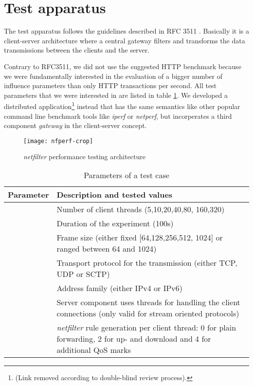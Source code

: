 \documentclass{sig-alternate}
\begin{document}
\section{Test apparatus}
\label{sec::apparatus}
\noindent The test apparatus follows the guidelines described in RFC 3511 
\cite{/RFC3511/}. Basically it is a client-server architecture where a 
central gateway filters and transforms the data transmissions between the 
clients and the server.

Contrary to RFC3511, we did not use the suggested HTTP benchmark because we 
were fundamentally interested in the evaluation of a bigger number of influence 
parameters than only HTTP transactions per se\-cond. All test parameters that 
we were interested in are listed in table \ref{tab::parameters}. We developed a 
distributed application\footnote{(Link removed according to double-blind 
review process).} instead that has the same semantics like other popular command 
line benchmark tools like \emph{iperf} or \emph{netperf}, but incorperates a 
third component \emph{gateway} in the client-server concept.
\begin{figure}[!t]
\texttt{[image: nfperf-crop]}
\caption{\emph{netfilter} performance testing architecture}
\label{fig::architecture}
\end{figure}
\begin{table}[htb]
\caption{Parameters of a test case}\label{tab::parameters}
\footnotesize
\begin{tabular}{|c|p{}|}
\hline \textbf{Parameter} & \textbf{Description and tested values} \\
\hline  & Number of client threads (5,10,20,40,80, 160,320) \\
\hline  & Duration of the experiment (100s) \\
\hline  & Frame size (either fixed [64,128,256,512, 1024] or ranged between 
64 and 1024) \\
\hline  & Transport protocol for the transmission (either TCP, UDP or SCTP) 
\\
\hline  & Address family (either IPv4 or IPv6) \\
\hline  & Server component uses threads for handling the client connections 
(only valid for stream oriented protocols) \\
\hline  & \emph{netfilter} rule generation per client thread: 0 for plain 
forwarding, 2 for up- and download and 4 for additional QoS marks \\
\hline
\end{tabular}
\end{table}
\end{document}
